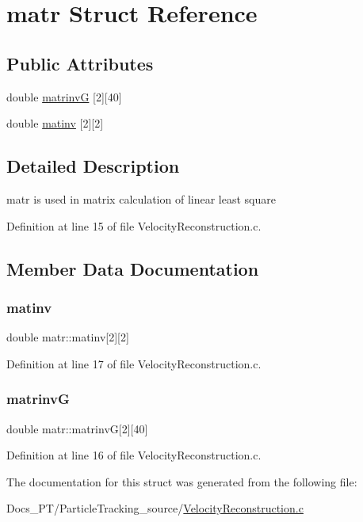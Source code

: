 \hypertarget{structmatr}{}\section{matr Struct Reference}
\label{structmatr}
\subsection*{Public Attributes}
\begin{DoxyCompactItemize}
\item 
double \mbox{\hyperlink{structmatr_a2233efa6510134d01a3a0a0245f5d631}{matrinvG}} \mbox{[}2\mbox{]}\mbox{[}40\mbox{]}
\item 
double \mbox{\hyperlink{structmatr_a70ef628f861867c49550cad75d4c5b00}{matinv}} \mbox{[}2\mbox{]}\mbox{[}2\mbox{]}
\end{DoxyCompactItemize}


\subsection{Detailed Description}
matr is used in matrix calculation of linear least square 

Definition at line 15 of file Velocity\+Reconstruction.\+c.



\subsection{Member Data Documentation}
\mbox{\label{structmatr_a70ef628f861867c49550cad75d4c5b00}} 
\subsubsection{\texorpdfstring{matinv}{matinv}}
{\footnotesize\ttfamily double matr\+::matinv\mbox{[}2\mbox{]}\mbox{[}2\mbox{]}}



Definition at line 17 of file Velocity\+Reconstruction.\+c.

\mbox{\label{structmatr_a2233efa6510134d01a3a0a0245f5d631}} 
\subsubsection{\texorpdfstring{matrinvG}{matrinvG}}
{\footnotesize\ttfamily double matr\+::matrinvG\mbox{[}2\mbox{]}\mbox{[}40\mbox{]}}



Definition at line 16 of file Velocity\+Reconstruction.\+c.



The documentation for this struct was generated from the following file\+:\begin{DoxyCompactItemize}
\item 
Docs\+\_\+\+P\+T/\+Particle\+Tracking\+\_\+source/\mbox{\hyperlink{_velocity_reconstruction_8c}{Velocity\+Reconstruction.\+c}}\end{DoxyCompactItemize}
